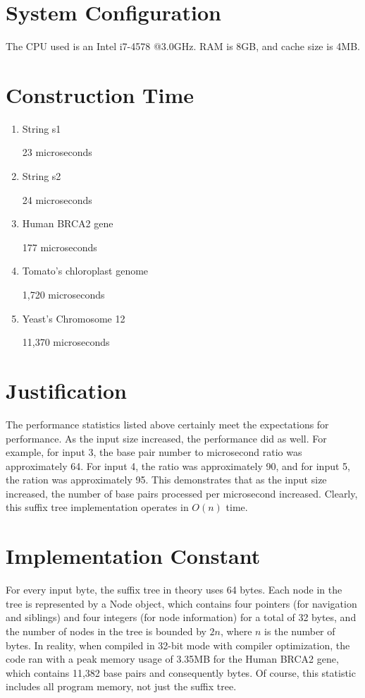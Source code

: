 \documentclass[12pt,a4paper]{article}
\author{Raeanne Marks}
\begin{document}
\section{System Configuration}
The CPU used is an Intel i7-4578 @3.0GHz. RAM is 8GB, and cache size is 4MB.
\section{Construction Time}
\begin{enumerate}
\item String s1

 23 microseconds
 
\item String s2

 24 microseconds
 
\item Human BRCA2 gene

 177 microseconds
 
\item Tomato's chloroplast genome

 1,720 microseconds
 
\item Yeast's Chromosome 12

11,370 microseconds
\end{enumerate}
\section{Justification}
The performance statistics listed above certainly meet the expectations for performance. As the input size increased, the performance did as well. For example, for input 3, the base pair number to microsecond ratio was approximately 64. For input 4, the ratio was approximately 90, and for input 5, the ration was approximately 95. This demonstrates that as the input size increased, the number of base pairs processed per microsecond increased. Clearly, this suffix tree implementation operates in $O(n)$ time.
\section{Implementation Constant}
For every input byte, the suffix tree in theory uses 64 bytes. Each node in the tree is represented by a Node object, which contains four pointers (for navigation and siblings) and four integers (for node information) for a total of 32 bytes, and the number of nodes in the tree is bounded by $2n$, where $n$ is the number of bytes. In reality, when compiled in 32-bit mode with compiler optimization, the code ran with a peak memory usage of 3.35MB for the Human BRCA2 gene, which contains 11,382 base pairs and consequently bytes. Of course, this statistic includes all program memory, not just the suffix tree.
\end{document}
